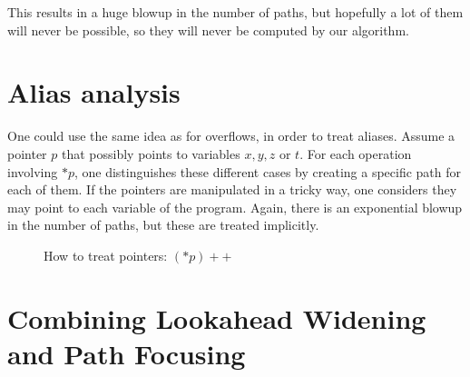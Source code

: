 \documentclass[a4paper,english,titlepage,11pt]{report}
\begin{document}
This results in a huge blowup in the number of paths, but hopefully a lot of
them will never be possible, so they will never be computed by our algorithm.

	\section{Alias analysis}

One could use the same idea as for overflows, in order to treat aliases.
Assume a pointer $p$ that possibly points to variables $x,y,z$ or $t$. For each
operation involving $*p$, one distinguishes these different cases by
creating a specific path for each of them. 
If the pointers are manipulated in a tricky way, one considers they may
point to each variable of the program. Again, there is an exponential blowup in
the number of paths, but these are treated implicitly.

\begin{figure}[!h]
\centering
{}
\caption{How to treat pointers: $(*p)++$}
\label{pointers}
\end{figure}

	\section{Combining Lookahead Widening and Path Focusing}
\end{document}
